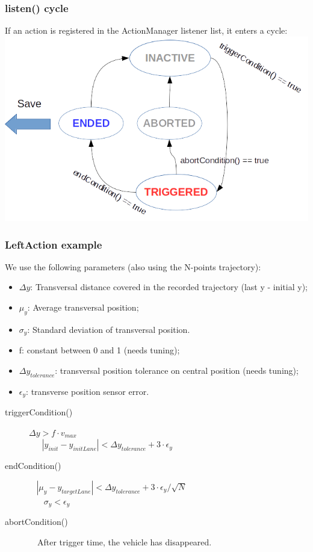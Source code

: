 \documentclass{beamer}
\begin{document}
\begin{frame}
\frametitle{listen() cycle}
If an action is registered in the ActionManager listener list, it enters a cycle:\\

\centering
\includegraphics[scale=0.6]{ListeningCycle2}

\end{frame}

\begin{frame}
\frametitle{LeftAction example}

We use the following parameters (also using the N-points trajectory):
\begin{itemize}
\item $\Delta y$: Transversal distance covered in the recorded trajectory (last y - initial y);
\item $\mu_y$: Average transversal position;
\item $\sigma_y$: Standard deviation of transversal position.
\item f: constant between 0 and 1 (needs tuning);
\item $\Delta y_{tolerance}$: transversal position tolerance on central position (needs tuning);
\item $\epsilon_y$: transverse position sensor error. 
\end{itemize}

\bigskip

\begin{description}
\item[triggerCondition()] 
$ \Delta y > f\cdot v_{max}$ \\
 $\ \ \ \ \ \ \ |y_{init} - y_{initLane}| < \Delta y_{tolerance} + 3\cdot\epsilon_y$

\item[endCondition()] 
$\ \ \ \ |\mu_y - y_{targetLane}| < \Delta y_{tolerance} + 3\cdot\epsilon_y/\sqrt{N}$ \\
$\ \ \ \ \ \ \ \ \sigma_y < \epsilon_y$

\item[abortCondition()] \ \ After trigger time, the vehicle has disappeared.
 
\end{description}
\end{frame}
\end{document}
